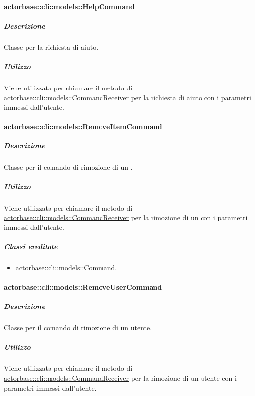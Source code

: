 \documentclass{scalatekids-article}
\begin{document}
\paragraph{actorbase::cli::models::HelpCommand}
\label{sec:actorbase::cli::models::HelpCommand}

\subparagraph{Descrizione}

Classe per la richiesta di aiuto.

\subparagraph{Utilizzo}

Viene utilizzata per chiamare il metodo di
actorbase::cli::models::CommandReceiver per la richiesta di aiuto con i
parametri immessi dall'utente.

\paragraph{actorbase::cli::models::RemoveItemCommand}
\label{sec:actorbase::cli::models::RemoveItemCommand}

\subparagraph{Descrizione}

Classe per il comando di rimozione di un .

\subparagraph{Utilizzo}

Viene utilizzata per chiamare il metodo di
\hyperref[sec:actorbase::cli::models::CommandReceiver]{actorbase::cli::models::CommandReceiver} per la rimozione di un 
con i parametri immessi dall'utente.

\subparagraph{Classi ereditate}

\begin{itemize}
\item \hyperref[sec:actorbase::cli::models::Command]{actorbase::cli::models::Command}.
\end{itemize}

\paragraph{actorbase::cli::models::RemoveUserCommand}
\label{sec:actorbase::cli::models::RemoveUserCommand}

\subparagraph{Descrizione}

Classe per il comando di rimozione di un utente.

\subparagraph{Utilizzo}

Viene utilizzata per chiamare il metodo di
\hyperref[sec:actorbase::cli::models::CommandReceiver]{actorbase::cli::models::CommandReceiver} per la rimozione di un utente con i
parametri immessi dall'utente.
\end{document}
